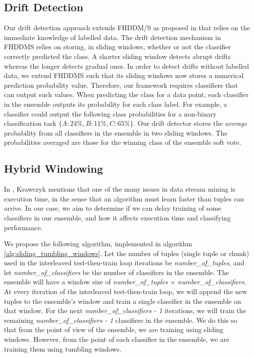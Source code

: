 \documentclass[runningheads]{llncs}
\begin{document}
\subsection{Drift Detection}
Our drift detection approach extends FHDDM/S as proposed in \cite{pesaranghader2016fast} that relies on the immediate knowledge of labelled data. The drift detection mechanism in FHDDMS relies on storing, in sliding windows, whether or not the classifier correctly predicted the class. A shorter sliding window detects abrupt drifts whereas the longer detects gradual ones. In order to detect drifts without labelled data, we  extend FHDDMS such that its sliding windows now stores a numerical prediction probability value. Therefore, our framework requires classifiers that can output such values. When predicting the class for a data point, each classifier in the ensemble outputs its probability for each class label. For example, a classifier could output the following class probabilities for a non-binary classification task $\{A: 24\%, B: 11\%, C: 65\%\}$.
Our drift detector stores the \textit{average} probability from all classifiers in the ensemble in two sliding windows. The probabilities averaged are those for the winning class of the ensemble soft vote.

\subsection{Hybrid Windowing}

 In \cite{KRAWCZYK2017132}, Krawczyk mentions that one of the many issues in data stream mining is execution time, in the sense that an algorithm must learn faster than tuples can arrive. In our case, we aim to determine if we can delay training of some classifiers in our ensemble, and how it affects execution time and classifying performance.

We propose the following algorithm, implemented in algorithm \ref{alg:sliding_tumbling_windows}.
Let the number of tuples (single tuple or chunk) used in the interleaved test-then-train loop iterations be \textit{number\_of\_tuples}, and let \textit{number\_of\_classifiers} be the number of classifiers in the ensemble. The ensemble will have a window size of \textit{number\_of\_tuples} $\times$ \textit{number\_of\_classifiers}. At every iteration of the interleaved test-then-train loop, we will append the new tuples to the ensemble's window and train a single classifier in the ensemble on that window. For the next \textit{number\_of\_classifiers - 1} iterations, we will train the remaining \textit{number\_of\_classifiers - 1} classifiers in the ensemble. We do this so that from the point of view of the ensemble, we are training using sliding windows. However, from the point of each classifier in the ensemble, we are training them using tumbling windows.
\end{document}

